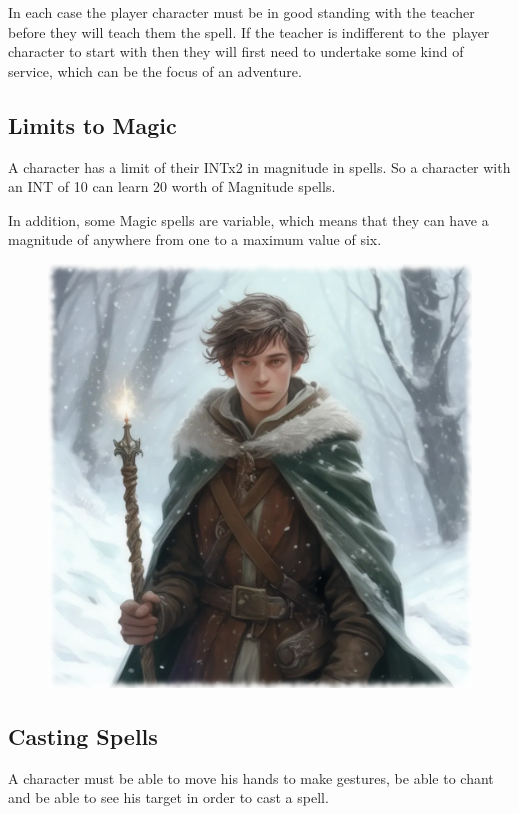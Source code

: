In each case the player character must be in good standing with the teacher before they will teach them the spell. If the teacher is indifferent to the player character to start with then they will first need to undertake some kind of service, which can be the focus of an adventure.

\subsection{Limits to Magic}
A character has a limit of their INTx2 in magnitude in spells. So a character with an INT of 10 can learn 20 worth of Magnitude spells.

In addition, some Magic spells are variable, which means that they can have a magnitude of anywhere from one to a maximum value of six.

\begin{figure}[h]
\begin{center}
\includegraphics[scale=0.24]{img/ai-images/young-wizard-in-snow.png}
\end{center}
\end{figure}

\subsection{Casting Spells}
A character must be able to move his hands to make gestures, be able to chant and be able to see his target in order to cast a spell.

